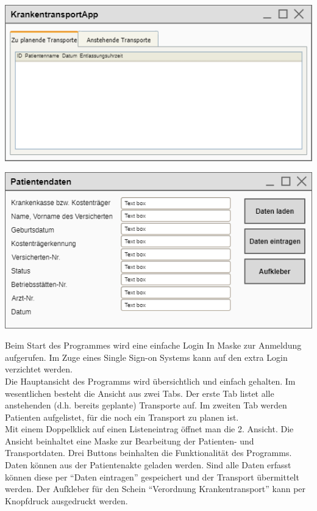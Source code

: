\documentclass[a4paper, ngerman, 12pt]{scrartcl}
\begin{document}
\begin{center}
\begin{minipage}[b]{0.48\textwidth}
	\centering
	\includegraphics[width=\textwidth]{Bilder/mainpage_1.png}
	\label{img:zenger3}
\end{minipage}
\begin{minipage}[b]{0.48\textwidth}
	\centering
	\includegraphics[width=\textwidth]{Bilder/verordnungpage.png}
	\label{img:zenger4}
\end{minipage}
\end{center}
Beim Start des Programmes wird eine einfache Login In Maske zur Anmeldung aufgerufen. Im Zuge eines Single Sign-on Systems kann auf den extra Login verzichtet werden.\\
Die Hauptansicht des Programms wird übersichtlich und einfach gehalten. Im wesentlichen besteht die Ansicht aus zwei Tabs. Der erste Tab listet alle anstehenden (d.h. bereits geplante) Transporte auf. Im zweiten Tab werden Patienten aufgelistet, für die noch ein Transport zu planen ist.\\
Mit einem Doppelklick auf einen Listeneintrag öffnet man die 2. Ansicht. Die Ansicht beinhaltet eine Maske zur Bearbeitung der Patienten- und Transportdaten. Drei Buttons beinhalten die Funktionalität des Programms. Daten können aus der Patientenakte geladen werden. Sind alle Daten erfasst können diese per ``Daten eintragen'' gespeichert und der Transport übermittelt werden. Der Aufkleber für den Schein ``Verordnung Krankentransport'' kann per Knopfdruck ausgedruckt werden.
\end{document}

